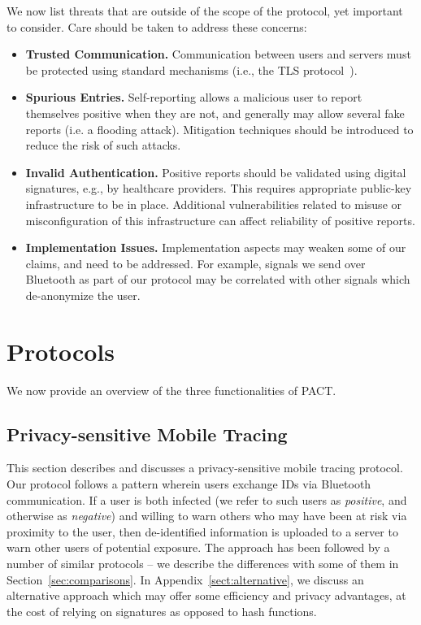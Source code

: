 \documentclass{article}
\begin{document}
We now list threats that are outside of the scope of the protocol, yet important to consider. Care should be taken to address these concerns:
\begin{itemize}
    \item {\bf Trusted Communication.} Communication between users and servers must be protected using standard mechanisms (i.e., the TLS protocol~\cite{TLS}).
    \item {\bf Spurious Entries.} Self-reporting allows a malicious user to report themselves positive when they are not, and generally may allow several fake reports (i.e. a flooding attack). Mitigation techniques should be introduced to reduce the risk of such attacks.  
    \item {\bf Invalid Authentication.} Positive reports should be validated using digital signatures, e.g., by healthcare providers. This requires appropriate public-key infrastructure to be in place. Additional vulnerabilities related to misuse or misconfiguration of this infrastructure can affect reliability of positive reports.
 \item {\bf Implementation Issues.} Implementation aspects may weaken some of our claims, and need to be addressed. For example, signals we send over Bluetooth as part of our protocol may be correlated with other signals which de-anonymize the user. 
   
    
\end{itemize}

\section{Protocols} 
We now provide an overview of the three functionalities of PACT.


\subsection{Privacy-sensitive Mobile Tracing} \label{sect:Bluetooth}

This section describes and discusses a privacy-sensitive mobile tracing protocol. Our protocol follows a pattern wherein users exchange IDs via Bluetooth communication.   If a user is both infected (we refer to such users as {\em positive}, and otherwise as {\em negative}) and willing to warn others who may have been at risk via proximity to the user, then de-identified information is uploaded to a server to warn other users of potential exposure. The approach has been followed by a number of similar protocols -- we describe the differences with some of them in Section~\ref{sec:comparisons}. In Appendix~\ref{sect:alternative}, we discuss an alternative approach which may offer some efficiency and privacy advantages, at the cost of relying on signatures as opposed to hash functions. 
\end{document}
